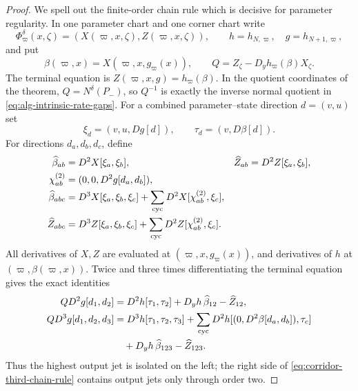 \documentclass[11pt]{amsart}
\numberwithin{equation}{section}
\theoremstyle{definition}
\theoremstyle{remark}
\begin{document}
\begin{proof}
We spell out the finite-order chain rule which is decisive for parameter
regularity.  In one parameter chart and one corner chart write
\[
 \Phi_\varpi^\delta(x,\zeta)
   =(X(\varpi,x,\zeta),Z(\varpi,x,\zeta)),
 \qquad h=h_{N,\varpi},\quad g=h_{N+1,\varpi},
\]
and put
\begin{equation}\label{eq:corridor-beta-Q}
 \beta(\varpi,x)=X(\varpi,x,g_\varpi(x)),\qquad
 Q=Z_\zeta-D_yh_\varpi(\beta)X_\zeta.
\end{equation}
The terminal equation is $Z(\varpi,x,g)=h_\varpi(\beta)$.  In the
quotient coordinates of the theorem, $Q=N^\delta(P_-)$, so $Q^{-1}$ is
exactly the inverse normal quotient in
\eqref{eq:alg-intrinsic-rate-gaps}.  For a combined parameter--state
direction $d=(v,u)$ set
\[
 \xi_d=(v,u,Dg[d]),\qquad \tau_d=(v,D\beta[d]).
\]
For directions $d_a,d_b,d_c$, define
\begin{align*}
 \widehat\beta_{ab}&=D^2X[\xi_a,\xi_b],&
 \widehat Z_{ab}&=D^2Z[\xi_a,\xi_b],\\
 \chi^{(2)}_{ab}&=(0,0,D^2g[d_a,d_b]),\\
 \widehat\beta_{abc}
 &=D^3X[\xi_a,\xi_b,\xi_c]
   +\sum_{\rm cyc}D^2X[\chi^{(2)}_{ab},\xi_c],\\
 \widehat Z_{abc}
 &=D^3Z[\xi_a,\xi_b,\xi_c]
   +\sum_{\rm cyc}D^2Z[\chi^{(2)}_{ab},\xi_c].
\end{align*}
All derivatives of $X,Z$ are evaluated at $(\varpi,x,g_\varpi(x))$, and
derivatives of $h$ at $(\varpi,\beta(\varpi,x))$.  Twice and three times
differentiating the terminal equation gives the exact identities
\begin{align}
 QD^2g[d_1,d_2]
 &=D^2h[\tau_1,\tau_2]+D_yh\,\widehat\beta_{12}
       -\widehat Z_{12},
 \label{eq:corridor-second-chain-rule}\\
 QD^3g[d_1,d_2,d_3]
 &=D^3h[\tau_1,\tau_2,\tau_3]
   +\sum_{\rm cyc}D^2h[(0,D^2\beta[d_a,d_b]),\tau_c]\notag\\
 &\quad
   +D_yh\,\widehat\beta_{123}-\widehat Z_{123}.
 \label{eq:corridor-third-chain-rule}
\end{align}
Thus the highest output jet is isolated on the left; the right side of
\eqref{eq:corridor-third-chain-rule} contains output jets only through
order two.


\end{proof}
\end{document}
